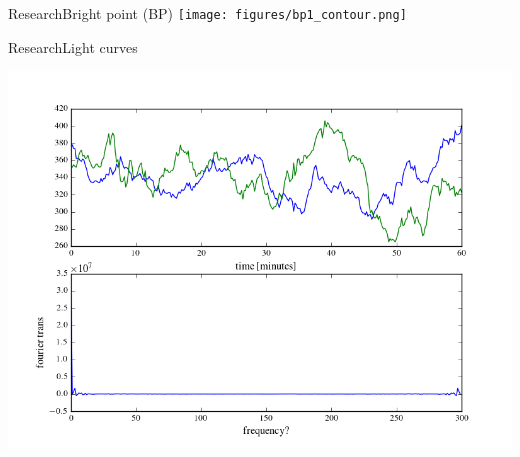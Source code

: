 \documentclass[11pt,table]{beamer}
\begin{document}
\begin{frame}{Research}{Bright point (BP)}
    \centering
    \texttt{[image: figures/bp1\_contour.png]}
\end{frame}%
\begin{frame}{Research}{Light curves}
    \begin{center}
        \includegraphics[width=0.8\paperwidth]{figure_1.png}
    \end{center}
\end{frame}%
\end{document}
